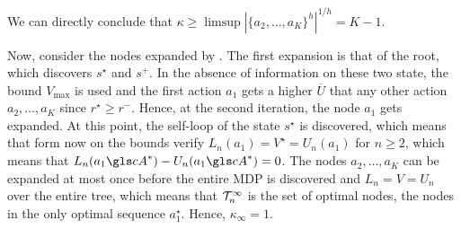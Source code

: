 We can directly conclude that $\kappa \geq \limsup{|\{a_2,\dots,a_K\}^h|^{1/h}} = K-1$.

Now, consider the nodes expanded by \GBOPD. The first expansion is that of the root, which discovers $s^\star$ and $s^+$. In the absence of information on these two state, the bound $V_{\max}$ is used and the first action $a_1$ gets a higher $\overline{U}$ that any other action $a_2,\dots,a_K$ since $r^\star \geq r^-$. Hence, at the second iteration, the node $a_1$ gets expanded. At this point, the self-loop of the state $s^\star$ is discovered, which means that form now on the bounds verify $L_n(a_1) = V^\star = U_n(a_1)$ for $n\geq2$, which means that $L_n(a_1\cA^*)-U_n(a_1\cA^*) = 0$. The nodes $a_2,\dots,a_K$ can be expanded at most once before the entire \gls{MDP} is discovered and $L_n=V=U_n$ over the entire tree, which means that $\mathcal{T}_n^\infty$ is the set of optimal nodes, \ie the nodes in the only optimal sequence $a_1^\star$. Hence, $\kappa_\infty = 1.$ 